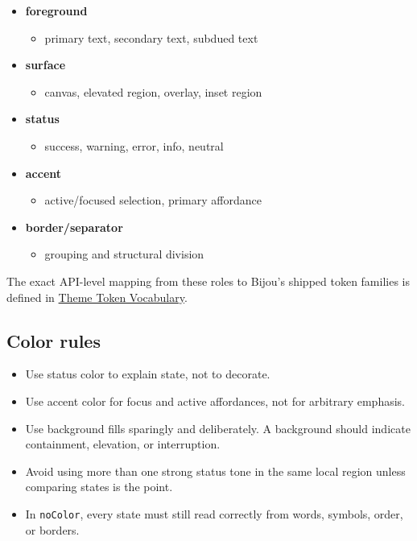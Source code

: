 \begin{itemize}
\tightlist
\item
  \textbf{foreground}

  \begin{itemize}
  \tightlist
  \item
    primary text, secondary text, subdued text
  \end{itemize}
\item
  \textbf{surface}

  \begin{itemize}
  \tightlist
  \item
    canvas, elevated region, overlay, inset region
  \end{itemize}
\item
  \textbf{status}

  \begin{itemize}
  \tightlist
  \item
    success, warning, error, info, neutral
  \end{itemize}
\item
  \textbf{accent}

  \begin{itemize}
  \tightlist
  \item
    active/focused selection, primary affordance
  \end{itemize}
\item
  \textbf{border/separator}

  \begin{itemize}
  \tightlist
  \item
    grouping and structural division
  \end{itemize}
\end{itemize}

The exact API-level mapping from these roles to Bijou's shipped token families is defined in \href{https://github.com/flyingrobots/bijou/blob/cbd70612140e7a450d764b3c7be1c6af878b99bc/docs/design-system/theme-tokens.md}{Theme Token Vocabulary}.

\subsection{Color rules}\label{record-021-color-rules}

\begin{itemize}
\tightlist
\item
  Use status color to explain state, not to decorate.
\item
  Use accent color for focus and active affordances, not for arbitrary emphasis.
\item
  Use background fills sparingly and deliberately. A background should indicate containment, elevation, or interruption.
\item
  Avoid using more than one strong status tone in the same local region unless comparing states is the point.
\item
  In \texttt{n\allowbreak{}o\allowbreak{}C\allowbreak{}o\allowbreak{}l\allowbreak{}o\allowbreak{}r}, every state must still read correctly from words, symbols, order, or borders.
\end{itemize}

